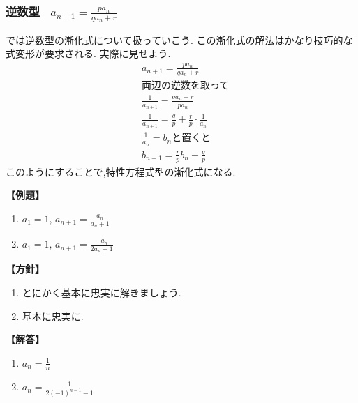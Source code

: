 
\subsubsection{逆数型  \, $\displaystyle a_{n+1}=\frac{pa_n}{qa_n+r}$}
では逆数型の漸化式について扱っていこう.
この漸化式の解法はかなり技巧的な式変形が要求される.
実際に見せよう.
\begin{align*}
   & a_{n+1}=\frac{pa_n}{qa_n+r}                                 \\
   & \text{両辺の逆数を取って}                                            \\
   & \frac{1}{a_{n+1}}=\frac{qa_n+r}{pa_n}                       \\
   & \frac{1}{a_{n+1}}=\frac{q}{p}+\frac{r}{p}\cdot\frac{1}{a_n} \\
   & \text{$\displaystyle \frac{1}{a_n}=b_n$と置くと}                \\
   & b_{n+1}=\frac{r}{p}b_n+\frac{q}{p}
\end{align*}
このようにすることで,特性方程式型の漸化式になる.

\noindent \textbf{【例題】}
\begin{enumerate}[label=(\arabic*),parsep=3pt]
  \item $\displaystyle a_1=1,\, a_{n+1}=\frac{a_n}{a_n+1}$
  \item $\displaystyle a_1=1,\, a_{n+1}=\frac{-a_n}{2a_n+1}$
\end{enumerate}

\noindent\textbf{【方針】}
\begin{enumerate}[label=(\arabic*),parsep=3pt]
  \item とにかく基本に忠実に解きましょう.
  \item 基本に忠実に.
\end{enumerate}

\noindent\textbf{【解答】}
\begin{enumerate}[label=(\arabic*),parsep=3pt]
  \item $\displaystyle a_n=\frac{1}{n}$
  \item $\displaystyle a_n=\frac{1}{2(-1)^{n-1}-1}$
\end{enumerate}

